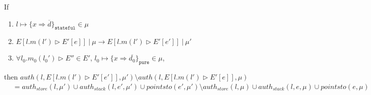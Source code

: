 \documentclass{llncs}
\newcommand{\keywadj}[1]{\mathtt{#1}}
\begin{document}
\begin{mdframed}
\begin{lemma} If
\begin{enumerate}
\item $l \mapsto \{ x \Rightarrow \overline{d} \}_{\keywadj{stateful}} \in \mu$
\item $E[l.m(l') \rhd E'[e]]~|~\mu \longrightarrow E[l.m(l') \rhd E'[e']]~|~\mu'$
\item $\forall l_0.m_0(l_0') \rhd E'' \in E'$, $l_0 \mapsto \{ x \Rightarrow \overline{d_0} \}_{\keywadj{pure}} \in \mu$,
\end{enumerate}
then $auth(l, E[l.m(l') \rhd E'[e']], \mu') \setminus auth(l, E[l.m(l') \rhd E'[e]], \mu)$
\vspace{-7pt}
\begin{align*}
&=  auth_{store}(l, \mu') \cup auth_{stack}(l, e', \mu') \cup pointsto(e', \mu') \setminus auth_{store}(l, \mu) \cup auth_{stack}(l, e, \mu) \cup pointsto(e, \mu)
\end{align*}
\end{lemma}
\end{mdframed}
\end{document}
